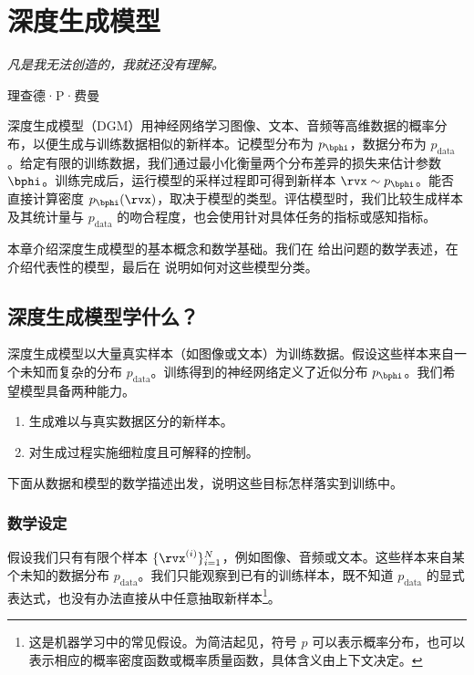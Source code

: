 \chapter{深度生成模型}\label{ch:overview-dgm}

\epigraph{
    \textit{凡是我无法创造的，我就还没有理解。}}{理查德·P·费曼}


深度生成模型（DGM）用神经网络学习图像、文本、音频等高维数据的概率分布，以便生成与训练数据相似的新样本。记模型分布为 $p_{\bphi}$，数据分布为 $p_{\mathrm{data}}$。给定有限的训练数据，我们通过最小化衡量两个分布差异的损失来估计参数 $\bphi$。训练完成后，运行模型的采样过程即可得到新样本 $\rvx \sim p_{\bphi}$。能否直接计算密度 $p_{\bphi}(\rvx)$，取决于模型的类型。评估模型时，我们比较生成样本及其统计量与 $p_{\mathrm{data}}$ 的吻合程度，也会使用针对具体任务的指标或感知指标。

本章介绍深度生成模型的基本概念和数学基础。我们在  给出问题的数学表述，在  介绍代表性的模型，最后在  说明如何对这些模型分类。



\section{深度生成模型学什么？}\label{sec:formulation-dgm}


深度生成模型以大量真实样本（如图像或文本）为训练数据。假设这些样本来自一个未知而复杂的分布 $p_{\mathrm{data}}$。训练得到的神经网络定义了近似分布 $p_{\bphi}$。我们希望模型具备两种能力。
\begin{enumerate}
\item {} 生成难以与真实数据区分的新样本。
\item {} 对生成过程实施细粒度且可解释的控制。
\end{enumerate}


下面从数据和模型的数学描述出发，说明这些目标怎样落实到训练中。
\subsection{数学设定}\label{subsec:intro-math-setup}
假设我们只有有限个样本 $\{\rvx^{(i)}\}_{i=1}^N$，例如图像、音频或文本。这些样本来自某个未知的数据分布 $p_{\mathrm{data}}$。我们只能观察到已有的训练样本，既不知道 $p_{\mathrm{data}}$ 的显式表达式，也没有办法直接从中任意抽取新样本\footnote{这是机器学习中的常见假设。为简洁起见，符号 $ p $ 可以表示概率分布，也可以表示相应的概率密度函数或概率质量函数，具体含义由上下文决定。}。


